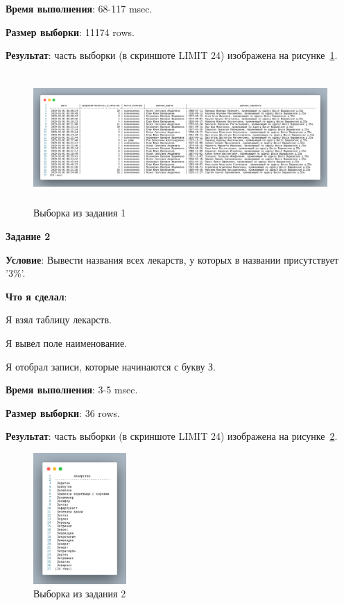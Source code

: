 \textbf{Время выполнения}: 68-117 msec.

\textbf{Размер выборки}: 11174 rows.

\textbf{Результат}: часть выборки (в скриншоте LIMIT 24) изображена на рисунке~\ref{fig:t1}.

\begin{figure}[!h]
  \centering

  \includegraphics[height=5cm]
  {../sql/task1/1-out.png}

  \caption{Выборка из задания 1}

  \label{fig:t1}
\end{figure}


\begin{center}
  \textbf{Задание 2}
\end{center}
  
\textbf{Условие}:
Вывести названия всех лекарств, у которых в названии присутствует '3\%'.
  
\textbf{Что я сделал}:

Я взял таблицу лекарств.

Я вывел поле наименование.

Я отобрал записи, которые начинаются с букву З.



\textbf{Время выполнения}: 3-5 msec.

\textbf{Размер выборки}: 36 rows.

\textbf{Результат}: часть выборки (в скриншоте LIMIT 24) изображена на рисунке~\ref{fig:t2}.

\begin{figure}[!h]
  \centering

  \includegraphics[height=5cm]
  {../sql/task2/2-out.png}

  \caption{Выборка из задания 2}

  \label{fig:t2}
\end{figure}

